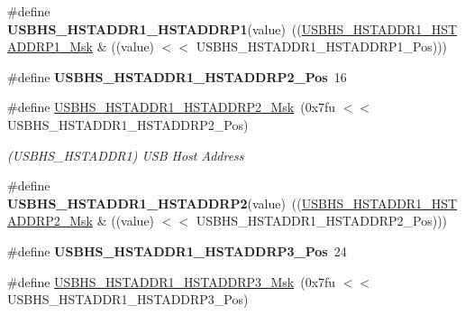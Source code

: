 \begin{DoxyCompactItemize}
\#define {\bfseries U\+S\+B\+H\+S\+\_\+\+H\+S\+T\+A\+D\+D\+R1\+\_\+\+H\+S\+T\+A\+D\+D\+R\+P1}(value)~((\mbox{\hyperlink{group__SAMV71__USBHS_gaf80878790141adcc9d0ef83325a9d64d}{U\+S\+B\+H\+S\+\_\+\+H\+S\+T\+A\+D\+D\+R1\+\_\+\+H\+S\+T\+A\+D\+D\+R\+P1\+\_\+\+Msk}} \& ((value) $<$$<$ U\+S\+B\+H\+S\+\_\+\+H\+S\+T\+A\+D\+D\+R1\+\_\+\+H\+S\+T\+A\+D\+D\+R\+P1\+\_\+\+Pos)))
\item 
\mbox{\label{group__SAMV71__USBHS_ga31f13677da4dddc57bc2acd2087af67a}} 
\#define {\bfseries U\+S\+B\+H\+S\+\_\+\+H\+S\+T\+A\+D\+D\+R1\+\_\+\+H\+S\+T\+A\+D\+D\+R\+P2\+\_\+\+Pos}~16
\item 
\mbox{\label{group__SAMV71__USBHS_ga58fe50a00c0a40126a2c76fa490f14a4}} 
\#define \mbox{\hyperlink{group__SAMV71__USBHS_ga58fe50a00c0a40126a2c76fa490f14a4}{U\+S\+B\+H\+S\+\_\+\+H\+S\+T\+A\+D\+D\+R1\+\_\+\+H\+S\+T\+A\+D\+D\+R\+P2\+\_\+\+Msk}}~(0x7fu $<$$<$ U\+S\+B\+H\+S\+\_\+\+H\+S\+T\+A\+D\+D\+R1\+\_\+\+H\+S\+T\+A\+D\+D\+R\+P2\+\_\+\+Pos)
\begin{DoxyCompactList}\small\item\em (U\+S\+B\+H\+S\+\_\+\+H\+S\+T\+A\+D\+D\+R1) U\+SB Host Address \end{DoxyCompactList}\item 
\mbox{\label{group__SAMV71__USBHS_ga2e1c2748d679d354d1179d10e7de6862}} 
\#define {\bfseries U\+S\+B\+H\+S\+\_\+\+H\+S\+T\+A\+D\+D\+R1\+\_\+\+H\+S\+T\+A\+D\+D\+R\+P2}(value)~((\mbox{\hyperlink{group__SAMV71__USBHS_ga58fe50a00c0a40126a2c76fa490f14a4}{U\+S\+B\+H\+S\+\_\+\+H\+S\+T\+A\+D\+D\+R1\+\_\+\+H\+S\+T\+A\+D\+D\+R\+P2\+\_\+\+Msk}} \& ((value) $<$$<$ U\+S\+B\+H\+S\+\_\+\+H\+S\+T\+A\+D\+D\+R1\+\_\+\+H\+S\+T\+A\+D\+D\+R\+P2\+\_\+\+Pos)))
\item 
\mbox{\label{group__SAMV71__USBHS_ga6ad9e240e9ea32635c4c3e7cb5245563}} 
\#define {\bfseries U\+S\+B\+H\+S\+\_\+\+H\+S\+T\+A\+D\+D\+R1\+\_\+\+H\+S\+T\+A\+D\+D\+R\+P3\+\_\+\+Pos}~24
\item 
\mbox{\label{group__SAMV71__USBHS_gac393d1ef7204508fbd9ff3028522ffbd}} 
\#define \mbox{\hyperlink{group__SAMV71__USBHS_gac393d1ef7204508fbd9ff3028522ffbd}{U\+S\+B\+H\+S\+\_\+\+H\+S\+T\+A\+D\+D\+R1\+\_\+\+H\+S\+T\+A\+D\+D\+R\+P3\+\_\+\+Msk}}~(0x7fu $<$$<$ U\+S\+B\+H\+S\+\_\+\+H\+S\+T\+A\+D\+D\+R1\+\_\+\+H\+S\+T\+A\+D\+D\+R\+P3\+\_\+\+Pos)

\end{DoxyCompactItemize}
